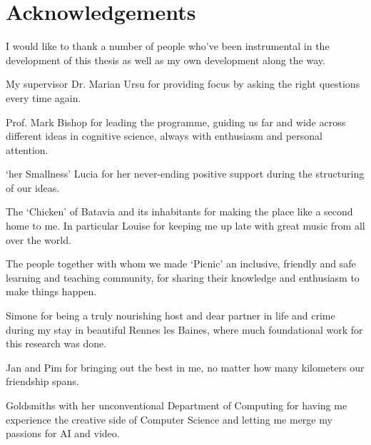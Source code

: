 \section{Acknowledgements} 
\label{sec:acknowledgements}

I would like to thank a number of people who've been instrumental in the development of this thesis as well as my own development along the way.

My supervisor Dr. Marian Ursu for providing focus by asking the right questions every time again.

Prof. Mark Bishop for leading the programme, guiding us far and wide across different ideas in cognitive science, always with enthusiasm and personal attention.

`her Smallness' Lucia for her never-ending positive support during the structuring of our ideas.

The `Chicken' of Batavia and its inhabitants for making the place like a second home to me. In particular Louise for keeping me up late with great music from all over the world.

The people together with whom we made `Picnic' an inclusive, friendly and safe learning and teaching community, for sharing their knowledge and enthusiasm to make things happen.

Simone for being a truly nourishing host and dear partner in life and crime during my stay in beautiful Rennes les Baines, where much foundational work for this research was done.

Jan and Pim for bringing out the best in me, no matter how many kilometers our friendship spans.

Goldsmiths with her unconventional Department of Computing for having me experience the creative side of Computer Science and letting me merge my passions for AI and video.